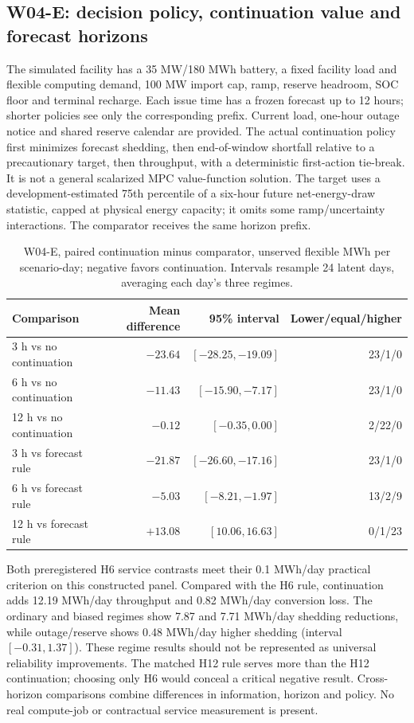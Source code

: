 \documentclass[11pt,letterpaper]{article}
\begin{document}
\subsection{W04-E: decision policy, continuation value and forecast horizons}
\label{sec:w04control}
The simulated facility has a 35 MW/180 MWh battery, a fixed facility load and flexible computing demand, 100 MW import cap, ramp, reserve headroom, SOC floor and terminal recharge. Each issue time has a frozen forecast up to 12 hours; shorter policies see only the corresponding prefix. Current load, one-hour outage notice and shared reserve calendar are provided. The actual continuation policy first minimizes forecast shedding, then end-of-window shortfall relative to a precautionary target, then throughput, with a deterministic first-action tie-break. It is not a general scalarized MPC value-function solution. The target uses a development-estimated 75th percentile of a six-hour future net-energy-draw statistic, capped at physical energy capacity; it omits some ramp/uncertainty interactions. The comparator receives the same horizon prefix.

\begin{table}[htbp]\centering\small
\caption{W04-E, paired continuation minus comparator, unserved flexible MWh per scenario-day; negative favors continuation. Intervals resample 24 latent days, averaging each day's three regimes.}
\begin{tabular}{lrrr}\toprule
Comparison & Mean difference & 95\% interval & Lower/equal/higher\\\midrule
3 h vs no continuation & $-23.64$ & $[-28.25,-19.09]$ &23/1/0\\
6 h vs no continuation & $-11.43$ & $[-15.90,-7.17]$ &23/1/0\\
12 h vs no continuation &$-0.12$ &$[-0.35,0.00]$ &2/22/0\\
3 h vs forecast rule &$-21.87$ &$[-26.60,-17.16]$ &23/1/0\\
6 h vs forecast rule &$-5.03$ &$[-8.21,-1.97]$ &13/2/9\\
12 h vs forecast rule &$+13.08$ &$[10.06,16.63]$ &0/1/23\\\bottomrule
\end{tabular}
\end{table}

Both preregistered H6 service contrasts meet their 0.1 MWh/day practical criterion on this constructed panel. Compared with the H6 rule, continuation adds 12.19 MWh/day throughput and 0.82 MWh/day conversion loss. The ordinary and biased regimes show 7.87 and 7.71 MWh/day shedding reductions, while outage/reserve shows 0.48 MWh/day higher shedding (interval $[-0.31,1.37]$). These regime results should not be represented as universal reliability improvements. The matched H12 rule serves more than the H12 continuation; choosing only H6 would conceal a critical negative result. Cross-horizon comparisons combine differences in information, horizon and policy. No real compute-job or contractual service measurement is present.
\end{document}

